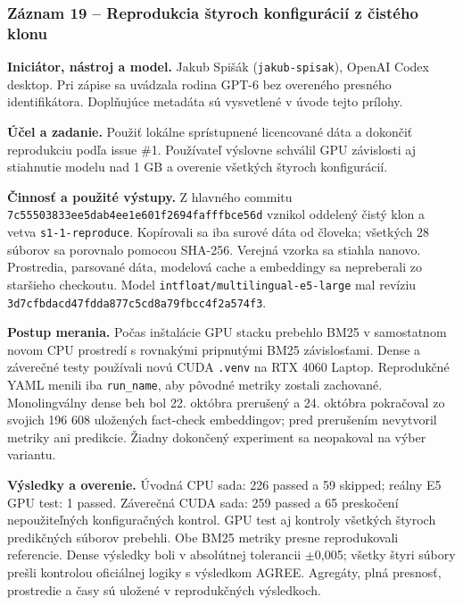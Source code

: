 \subsubsection*{Záznam 19 -- Reprodukcia štyroch konfigurácií z čistého klonu}


\par\noindent \textbf{Iniciátor, nástroj a model.} Jakub Spišák (\texttt{jakub-\allowbreak{}spisak}), OpenAI Codex desktop. Pri zápise sa uvádzala rodina GPT-6 bez overeného presného identifikátora. Doplňujúce metadáta sú vysvetlené v úvode tejto prílohy.\par\smallskip
\par\noindent \textbf{Účel a zadanie.} Použiť lokálne sprístupnené licencované dáta a dokončiť reprodukciu podľa issue \#1. Používateľ výslovne schválil GPU závislosti aj stiahnutie modelu nad 1 GB a overenie všetkých štyroch konfigurácií.\par\smallskip
\par\noindent \textbf{Činnosť a použité výstupy.} Z hlavného commitu \texttt{7c55503833ee\allowbreak{}5dab4ee1e601\allowbreak{}f2694fafffbc\allowbreak{}e56d} vznikol oddelený čistý klon a vetva \texttt{s1-\allowbreak{}1-\allowbreak{}reproduce}. Kopírovali sa iba surové dáta od človeka; všetkých 28 súborov sa porovnalo pomocou SHA-256. Verejná vzorka sa stiahla nanovo. Prostredia, parsované dáta, modelová cache a embeddingy sa nepreberali zo staršieho checkoutu. Model \texttt{intfloat/\allowbreak{}multilingual\allowbreak{}-\allowbreak{}e5-\allowbreak{}large} mal revíziu \texttt{3d7cfbdacd47\allowbreak{}fdda877c5cd8\allowbreak{}a79fbcc4f2a5\allowbreak{}74f3}.\par\smallskip
\par\noindent \textbf{Postup merania.} Počas inštalácie GPU stacku prebehlo BM25 v samostatnom novom CPU prostredí s rovnakými pripnutými BM25 závislosťami. Dense a záverečné testy používali novú CUDA \texttt{.\allowbreak{}venv} na RTX 4060 Laptop. Reprodukčné YAML menili iba \texttt{run\_\allowbreak{}name}, aby pôvodné metriky zostali zachované. Monolingválny dense beh bol 22. októbra prerušený a 24. októbra pokračoval zo svojich 196 608 uložených fact-check embeddingov; pred prerušením nevytvoril metriky ani predikcie. Žiadny dokončený experiment sa neopakoval na výber variantu.\par\smallskip
\par\noindent \textbf{Výsledky a overenie.} Úvodná CPU sada: 226 passed a 59 skipped; reálny E5 GPU test: 1 passed. Záverečná CUDA sada: 259 passed a 65 preskočení nepoužiteľných konfiguračných kontrol. GPU test aj kontroly všetkých štyroch predikčných súborov prebehli. Obe BM25 metriky presne reprodukovali referencie. Dense výsledky boli v absolútnej tolerancii $\pm$0,005; všetky štyri súbory prešli kontrolou oficiálnej logiky s výsledkom AGREE. Agregáty, plná presnosť, prostredie a časy sú uložené v reprodukčných výsledkoch.\par\smallskip
